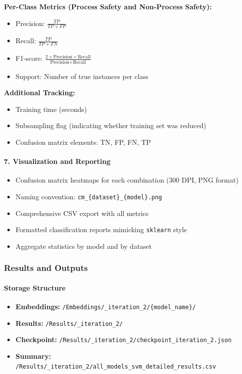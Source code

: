 \documentclass[11pt, titlepage, bibliography=totoc]{scrreprt}
\begin{document}
\textbf{Per-Class Metrics (Process Safety and Non-Process Safety):}
\begin{itemize}
    \item Precision: $\frac{TP}{TP + FP}$
    \item Recall: $\frac{TP}{TP + FN}$
    \item F1-score: $\frac{2 \times \text{Precision} \times \text{Recall}}{\text{Precision} + \text{Recall}}$
    \item Support: Number of true instances per class
\end{itemize}

\textbf{Additional Tracking:}
\begin{itemize}
    \item Training time (seconds)
    \item Subsampling flag (indicating whether training set was reduced)
    \item Confusion matrix elements: TN, FP, FN, TP
\end{itemize}

\paragraph{7. Visualization and Reporting}
\begin{itemize}
    \item Confusion matrix heatmaps for each combination (300 DPI, PNG format)
    \item Naming convention: \texttt{cm\_\{dataset\}\_\{model\}.png}
    \item Comprehensive CSV export with all metrics
    \item Formatted classification reports mimicking \texttt{sklearn} style
    \item Aggregate statistics by model and by dataset
\end{itemize}

\subsubsection{Results and Outputs}

\paragraph{Storage Structure}
\begin{itemize}
    \item \textbf{Embeddings:} \texttt{/Embeddings/\_iteration\_2/\{model\_name\}/}
\item \textbf{Results:} \texttt{/Results/\_iteration\_2/}
\item \textbf{Checkpoint:} \texttt{/Results/\_iteration\_2/checkpoint\_iteration\_2.json}
\item \textbf{Summary:} \texttt{/Results/\_iteration\_2/all\_models\_svm\_detailed\_results.csv}
\end{itemize}
\end{document}
